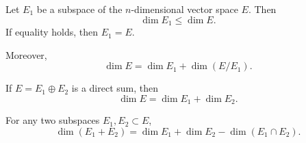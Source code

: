Let $E_1$ be a subspace of the $n$-dimensional vector space $E$. Then
$$\dim E_1 \leq \dim E.$$
If equality holds, then $E_1 = E$.

Moreover,
$$\dim E = \dim E_1 + \dim(E/E_1).$$

If $E = E_1 \oplus E_2$ is a direct sum, then
$$\dim E = \dim E_1 + \dim E_2.$$

For any two subspaces $E_1, E_2 \subset E$,
$$\dim(E_1 + E_2) = \dim E_1 + \dim E_2 - \dim(E_1 \cap E_2).$$
